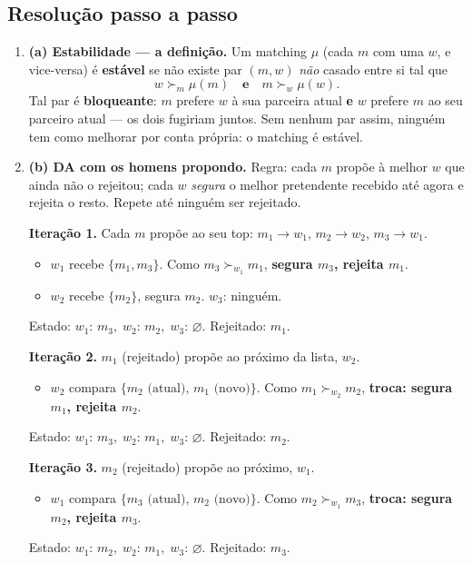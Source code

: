 \documentclass[11pt,a4paper]{article}
\begin{document}
\subsection*{Resolução passo a passo}
\begin{enumerate}[leftmargin=2em,itemsep=4pt]

\item \textbf{(a) Estabilidade — a definição.} Um matching $\mu$ (cada $m$ com uma $w$, e
vice-versa) é \textbf{estável} se não existe par $(m,w)$ \emph{não} casado entre si tal que
\[
w \succ_m \mu(m) \quad\textbf{e}\quad m \succ_w \mu(w). \tag{3.1}
\]
Tal par é \textbf{bloqueante}: $m$ prefere $w$ à sua parceira atual \textbf{e} $w$ prefere $m$
ao seu parceiro atual — os dois fugiriam juntos. Sem nenhum par assim, ninguém tem como
melhorar por conta própria: o matching é estável.

\item \textbf{(b) DA com os homens propondo.} Regra: cada $m$ propõe à melhor $w$ que ainda
não o rejeitou; cada $w$ \emph{segura} o melhor pretendente recebido até agora e rejeita o
resto. Repete até ninguém ser rejeitado.

\smallskip
\noindent\textbf{Iteração 1.} Cada $m$ propõe ao seu top: $m_1\to w_1$, $m_2\to w_2$,
$m_3\to w_1$.
\begin{itemize}[leftmargin=1.5em,itemsep=1pt,topsep=2pt]
\item $w_1$ recebe $\{m_1,m_3\}$. Como $m_3\succ_{w_1} m_1$, \textbf{segura $m_3$, rejeita $m_1$}.
\item $w_2$ recebe $\{m_2\}$, segura $m_2$. \quad $w_3$: ninguém.
\end{itemize}
Estado: $w_1{:}\,m_3,\;w_2{:}\,m_2,\;w_3{:}\,\varnothing$. Rejeitado: $m_1$.

\smallskip
\noindent\textbf{Iteração 2.} $m_1$ (rejeitado) propõe ao próximo da lista, $w_2$.
\begin{itemize}[leftmargin=1.5em,itemsep=1pt,topsep=2pt]
\item $w_2$ compara $\{m_2\text{ (atual)},\,m_1\text{ (novo)}\}$. Como $m_1\succ_{w_2} m_2$,
\textbf{troca: segura $m_1$, rejeita $m_2$}.
\end{itemize}
Estado: $w_1{:}\,m_3,\;w_2{:}\,m_1,\;w_3{:}\,\varnothing$. Rejeitado: $m_2$.

\smallskip
\noindent\textbf{Iteração 3.} $m_2$ (rejeitado) propõe ao próximo, $w_1$.
\begin{itemize}[leftmargin=1.5em,itemsep=1pt,topsep=2pt]
\item $w_1$ compara $\{m_3\text{ (atual)},\,m_2\text{ (novo)}\}$. Como $m_2\succ_{w_1} m_3$,
\textbf{troca: segura $m_2$, rejeita $m_3$}.
\end{itemize}
Estado: $w_1{:}\,m_2,\;w_2{:}\,m_1,\;w_3{:}\,\varnothing$. Rejeitado: $m_3$.


\end{enumerate}
\end{document}
